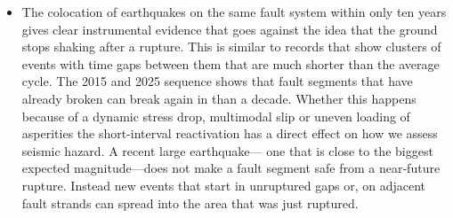 \begin{itemize}
     likely left unbroken barriers and generated new ones through stress redistribution. Because the dynamic stress increase at the 
     rupture front can exceed the static stress modifications induced by the 2015 event, the 2025 rupture was able to break through 
     residual barriers while skipping newly formed ones, resulting in multiple small slip asperities.
    \item The colocation of earthquakes on the same fault system within only ten years gives clear instrumental evidence that goes
     against the idea that the ground stops shaking after a rupture. This is similar to records that show clusters of events with time
      gaps between them that are much shorter than the average cycle. The 2015 and 2025 sequence shows that fault segments that have
       already broken can break again in than a decade. Whether this happens because of a dynamic stress drop, multimodal slip or uneven 
     loading of asperities the short-interval reactivation has a direct effect on how we assess seismic hazard. A recent large
        earthquake— one that is close to the biggest expected magnitude—does not make a fault segment safe from a near‑future rupture.
     Instead new events that start in unruptured gaps or, on adjacent fault strands can spread into the area that was just ruptured.
     
\end{itemize}
